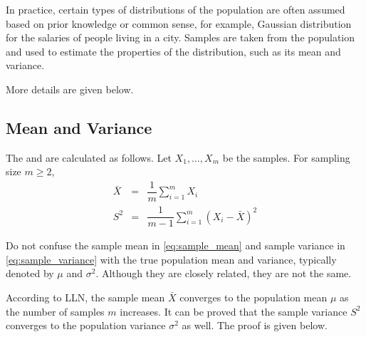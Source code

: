 In practice, certain types of distributions of the population are often assumed based on prior knowledge or common sense, for example, Gaussian distribution for the salaries of people living in a city. Samples are taken from the population and used to estimate the properties of the distribution, such as its mean and variance.

More details are given below.

\subsection{Mean and Variance}

The  and  are calculated as follows. Let $X_1, \ldots, X_m$ be the samples. For sampling size $m\geq 2$,
\begin{eqnarray}
	\bar{X} &=& \dfrac{1}{m}\sum_{i=1}^{m}X_i \label{eq:sample_mean} \\
	S^2 &=& \dfrac{1}{m-1}\sum_{i=1}^{m}\left(X_i - \bar{X}\right)^2 \label{eq:sample_variance}
\end{eqnarray}

Do not confuse the sample mean in \eqref{eq:sample_mean} and sample variance in \eqref{eq:sample_variance} with the true population mean and variance, typically denoted by $\mu$ and $\sigma^2$. Although they are closely related, they are not the same.

According to LLN, the sample mean $\bar{X}$ converges to the population mean $\mu$ as the number of samples $m$ increases. It can be proved that the sample variance $S^2$ converges to the population variance $\sigma^2$ as well. The proof is given below.

